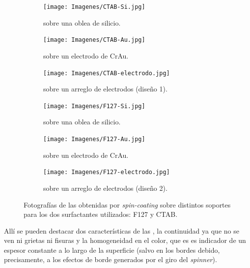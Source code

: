 			\begin{figure}[th]
	 	   	    \begin{subfigure}[t]{0.325\textwidth}
		        	\texttt{[image: Imagenes/CTAB-Si.jpg]}
		       		\caption{\pdmC\space sobre una oblea de silicio.}
		         	\label{fig:F127_vidrio}
		     		\end{subfigure}
	     		\begin{subfigure}[t]{0.325\textwidth}
		        	\texttt{[image: Imagenes/CTAB-Au.jpg]}
		       		\caption{\pdmC\space sobre un electrodo de Cr\textbar Au.}
		         	\label{fig:F127_silicio}
		     		\end{subfigure}
	     		\begin{subfigure}[t]{0.325\textwidth}
		        	\texttt{[image: Imagenes/CTAB-electrodo.jpg]}
		       		\caption{\pdmC\space sobre un arreglo de electrodos (diseño 1).}
		         	\label{fig:F127_Au}
		     		\end{subfigure}
	 	   	    \begin{subfigure}[t]{0.325\textwidth}
		        	\texttt{[image: Imagenes/F127-Si.jpg]}
		       		\caption{\pdmF\space sobre una oblea de silicio.}
		         	\label{fig:CTAB_vidrio}
		     		\end{subfigure}
	     		\begin{subfigure}[t]{0.325\textwidth}
		        	\texttt{[image: Imagenes/F127-Au.jpg]}
		       		\caption{\pdmF\space sobre un electrodo de Cr\textbar Au.}
		         	\label{fig:CTAB_silicio}
		     		\end{subfigure}
	     		\begin{subfigure}[t]{0.325\textwidth}
		        	\texttt{[image: Imagenes/F127-electrodo.jpg]}
		       		\caption{\pdmF\space sobre un arreglo de electrodos (diseño 2).}
		         	\label{fig:CTAB_Au}
		     		\end{subfigure}
	     		\caption[Películas mesoporosas sobre distintos soportes.]{Fotografías de las \pdm\space obtenidas por \textit{spin-coating }sobre distintos soportes para los dos surfactantes utilizados: F127 y CTAB.}
	     		\label{fig:fotos_films}
	     	   	\end{figure}

		Allí se pueden destacar dos características de las \pdm, la continuidad ya que no se ven ni grietas ni fisuras y la homogeneidad en el color, que es es indicador de un espesor constante a lo largo de la superficie (salvo en los bordes debido, precisamente, a los efectos de borde generados por el giro del \textit{spinner})\cite{Franssila2004,Jaeger2001}.

